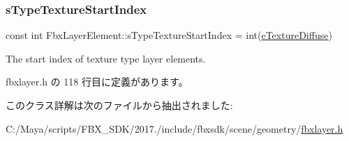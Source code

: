 \mbox{\label{class_fbx_layer_element_a207301b1a6ecb7cdbce89cb44093d0b7}} 
\subsubsection{\texorpdfstring{s\+Type\+Texture\+Start\+Index}{sTypeTextureStartIndex}}
{\footnotesize\ttfamily const int Fbx\+Layer\+Element\+::s\+Type\+Texture\+Start\+Index = int(\hyperlink{class_fbx_layer_element_a8c95c5cd880b56c776acd379bd86f42ca09829e6ecf512e7ae04d9ad8de1342fa}{e\+Texture\+Diffuse})\hspace{0.3cm}{\ttfamily [static]}}



The start index of texture type layer elements. 



 fbxlayer.\+h の 118 行目に定義があります。



このクラス詳解は次のファイルから抽出されました\+:\begin{DoxyCompactItemize}
\item 
C\+:/\+Maya/scripts/\+F\+B\+X\+\_\+\+S\+D\+K/2017./include/fbxsdk/scene/geometry/\hyperlink{fbxlayer_8h}{fbxlayer.\+h}\end{DoxyCompactItemize}
